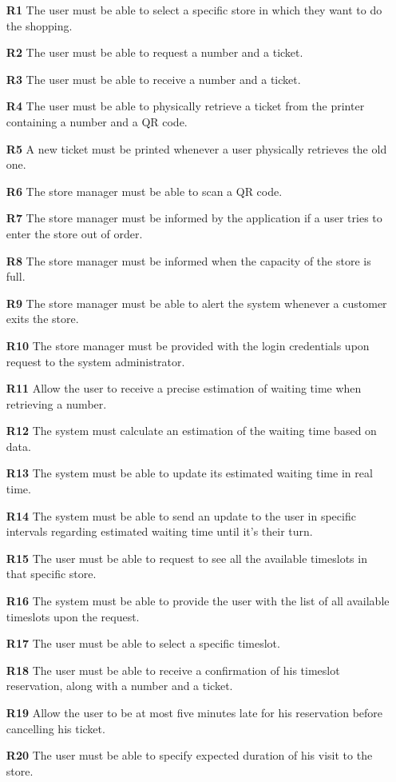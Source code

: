 \begin{enumerate}
			\item [\textbf{R1}] The user must be able to select a specific store in which they want to do the shopping.
			\item [\textbf{R2}] The user must be able to request a number and a ticket.
			\item [\textbf{R3}] The user must be able to receive a number and a ticket.
			\item [\textbf{R4}] The user must be able to physically retrieve a ticket from the printer containing a number and a QR code.
			\item [\textbf{R5}] A new ticket must be printed whenever a user physically retrieves the old one.
			\item [\textbf{R6}] The store manager must be able to scan a QR code.
			\item [\textbf{R7}] The store manager must be informed by the application if a user tries to enter the store out of order.
			\item [\textbf{R8}] The store manager must be informed when the capacity of the store is full.
			\item [\textbf{R9}] The store manager must be able to alert the system whenever a customer exits the store.
			\item [\textbf{R10}] The store manager must be provided with the login credentials upon request to the system administrator.	
			\item [\textbf{R11}] Allow the user to receive a precise estimation of waiting time when retrieving a number.
			\item [\textbf{R12}] The system must calculate an estimation of the waiting time based on data.
			\item [\textbf{R13}] The system must be able to update its estimated waiting time in real time.
			\item [\textbf{R14}] The system must be able to send an update to the user in specific intervals regarding estimated waiting time until it's their turn.
			\item [\textbf{R15}] The user must be able to request to see all the available timeslots in that specific store.
			\item [\textbf{R16}] The system must be able to provide the user with the list of all available timeslots upon the request.
			\item [\textbf{R17}] The user must be able to select a specific timeslot.
			\item [\textbf{R18}] The user must be able to receive a confirmation of his timeslot reservation, along with a number and a ticket.
			\item [\textbf{R19}] Allow the user to be at most five minutes late for his reservation before cancelling his ticket.
			\item [\textbf{R20}] The user must be able to specify expected duration of his visit to the store.
			\end{enumerate}			
\newpage
		
